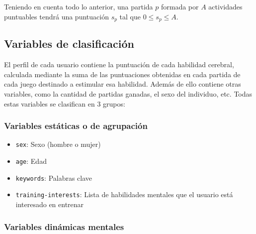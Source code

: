 Teniendo en cuenta todo lo anterior, una partida $p$ formada por $A$ actividades puntuables tendrá una puntuación $s_p$ tal que $0 \leq s_p \leq A$.

\subsection{Variables de clasificación}
\label{sec::variables-perfil-usuario}

El perfil de cada usuario contiene la puntuación de cada habilidad cerebral, calculada mediante la suma de las puntuaciones obtenidas en cada partida de cada juego destinado a estimular esa habilidad. Además de ello contiene otras variables, como la cantidad de partidas ganadas, el sexo del individuo, etc. Todas estas variables se clasifican en 3 grupos:

\subsubsection{Variables estáticas o de agrupación}

\begin{itemize}
\item {\tt sex}: Sexo (hombre o mujer)
\item {\tt age}: Edad
\item {\tt keywords}: Palabras clave
\item {\tt training-interests}: Lista de habilidades mentales que el usuario está interesado en entrenar
\end{itemize}

\subsubsection{Variables dinámicas mentales}

